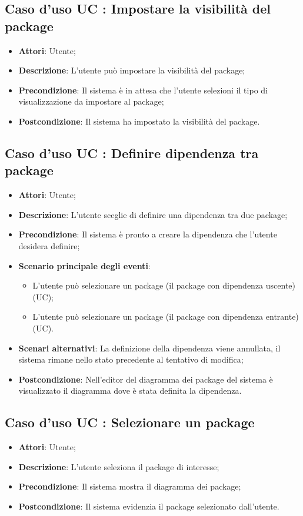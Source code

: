 \documentclass[../AnalisiDeiRequisiti.tex]{subfiles}
\begin{document}
		\subsection{Caso d'uso UC : Impostare la visibilità del package}
			\begin{itemize}
				\item \textbf{Attori}: Utente;
				\item \textbf{Descrizione}: L'utente può impostare la visibilità
				del package;
				\item \textbf{Precondizione}: Il sistema è in attesa che l'utente selezioni il
				tipo di visualizzazione da impostare al package;
				\item \textbf{Postcondizione}: Il sistema ha impostato la visibilità
				del package.
			\end{itemize}
		\subsection{Caso d'uso UC : Definire dipendenza tra package}
			\begin{itemize}
				\item \textbf{Attori}: Utente;
				\item \textbf{Descrizione}: L'utente sceglie di definire una dipendenza tra
				due package;
				\item \textbf{Precondizione}: Il sistema è pronto a creare la dipendenza che
				l'utente desidera definire;
				\item \textbf{Scenario principale degli eventi}:
					\begin{itemize}
						\item L'utente può selezionare un package (il package con dipendenza
						uscente) (UC);
						\item L'utente può selezionare un package (il package con dipendenza
						entrante) (UC).
					\end{itemize}
				\item \textbf{Scenari alternativi}: La definizione della dipendenza viene
				annullata, il sistema rimane nello stato precedente al tentativo di modifica;
				\item \textbf{Postcondizione}: Nell'editor del diagramma dei package del
				sistema è visualizzato il diagramma dove è stata definita la dipendenza.
			\end{itemize}
		\subsection{Caso d'uso UC : Selezionare un package}
			\begin{itemize}
				\item \textbf{Attori}: Utente;
				\item \textbf{Descrizione}: L'utente seleziona il package di interesse;
				\item \textbf{Precondizione}: Il sistema mostra il diagramma dei package;
				\item \textbf{Postcondizione}: Il sistema evidenzia il package selezionato
				dall'utente.
			\end{itemize}
\end{document}
